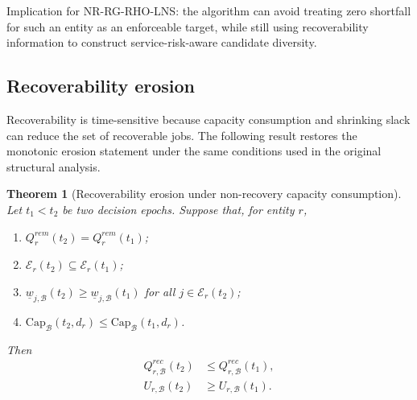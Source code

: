 \documentclass[a4paper,fleqn]{cas-sc}
\newtheorem{theorem}{Theorem}
\begin{document}
Implication for NR-RG-RHO-LNS: the algorithm can avoid treating zero shortfall for such an entity as an enforceable target, while still using recoverability information to construct service-risk-aware candidate diversity.

\subsection{Recoverability erosion}
\label{sec:recoverability_erosion}

Recoverability is time-sensitive because capacity consumption and shrinking slack can reduce the set of recoverable jobs. The following result restores the monotonic erosion statement under the same conditions used in the original structural analysis.

\begin{theorem}[Recoverability erosion under non-recovery capacity consumption]
\label{thm:erosion}
Let \(t_1<t_2\) be two decision epochs. Suppose that, for entity \(r\),
\begin{enumerate}
    \item[(C1)] \(Q_r^{rem}(t_2)=Q_r^{rem}(t_1)\);
    \item[(C2)] \(\mathcal E_r(t_2)\subseteq\mathcal E_r(t_1)\);
    \item[(C3)] \(\underline w_{j,\mathcal B}(t_2)\ge \underline w_{j,\mathcal B}(t_1)\) for all \(j\in\mathcal E_r(t_2)\);
    \item[(C4)] \(\mathrm{Cap}_{\mathcal B}(t_2,d_r)\le \mathrm{Cap}_{\mathcal B}(t_1,d_r)\).
\end{enumerate}
Then
\begin{align}
Q_{r,\mathcal B}^{rec}(t_2)&\le Q_{r,\mathcal B}^{rec}(t_1),
\label{eq:erosion_q}\\
U_{r,\mathcal B}(t_2)&\ge U_{r,\mathcal B}(t_1).
\label{eq:erosion_u}
\end{align}
\end{theorem}
\end{document}
